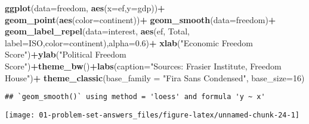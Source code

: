 \documentclass[
]{article}
\newenvironment{Shaded}{\begin{snugshade}}{\end{snugshade}}
\newcommand{\DataTypeTok}[1]{\textcolor[rgb]{0.13,0.29,0.53}{#1}}
\newcommand{\DecValTok}[1]{\textcolor[rgb]{0.00,0.00,0.81}{#1}}
\newcommand{\FloatTok}[1]{\textcolor[rgb]{0.00,0.00,0.81}{#1}}
\newcommand{\KeywordTok}[1]{\textcolor[rgb]{0.13,0.29,0.53}{\textbf{#1}}}
\newcommand{\NormalTok}[1]{#1}
\newcommand{\OperatorTok}[1]{\textcolor[rgb]{0.81,0.36,0.00}{\textbf{#1}}}
\newcommand{\StringTok}[1]{\textcolor[rgb]{0.31,0.60,0.02}{#1}}
\begin{document}
\begin{Shaded}
\begin{Highlighting}[]
\KeywordTok{ggplot}\NormalTok{(}\DataTypeTok{data=}\NormalTok{freedom, }\KeywordTok{aes}\NormalTok{(}\DataTypeTok{x=}\NormalTok{ef,}\DataTypeTok{y=}\NormalTok{gdp))}\OperatorTok{+}
\StringTok{  }\KeywordTok{geom_point}\NormalTok{(}\KeywordTok{aes}\NormalTok{(}\DataTypeTok{color=}\NormalTok{continent))}\OperatorTok{+}
\StringTok{  }\KeywordTok{geom_smooth}\NormalTok{(}\DataTypeTok{data=}\NormalTok{freedom)}\OperatorTok{+}
\StringTok{  }\KeywordTok{geom_label_repel}\NormalTok{(}\DataTypeTok{data=}\NormalTok{interest, }\KeywordTok{aes}\NormalTok{(ef, Total, }\DataTypeTok{label=}\NormalTok{ISO,}\DataTypeTok{color=}\NormalTok{continent),}\DataTypeTok{alpha=}\FloatTok{0.6}\NormalTok{)}\OperatorTok{+}
\StringTok{  }\KeywordTok{xlab}\NormalTok{(}\StringTok{"Economic Freedom Score"}\NormalTok{)}\OperatorTok{+}\KeywordTok{ylab}\NormalTok{(}\StringTok{"Political Freedom Score"}\NormalTok{)}\OperatorTok{+}\KeywordTok{theme_bw}\NormalTok{()}\OperatorTok{+}\KeywordTok{labs}\NormalTok{(}\DataTypeTok{caption=}\StringTok{"Sources: Frasier Institute, Freedom House"}\NormalTok{)}\OperatorTok{+}
\StringTok{  }\KeywordTok{theme_classic}\NormalTok{(}\DataTypeTok{base_family =} \StringTok{"Fira Sans Condensed"}\NormalTok{, }\DataTypeTok{base_size=}\DecValTok{16}\NormalTok{)}
\end{Highlighting}
\end{Shaded}

\begin{verbatim}
## `geom_smooth()` using method = 'loess' and formula 'y ~ x'
\end{verbatim}

\texttt{[image: 01-problem-set-answers\_files/figure-latex/unnamed-chunk-24-1]}
\end{document}
